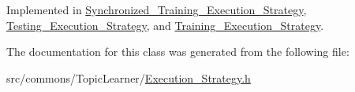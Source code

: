 Implemented in \hyperlink{class_synchronized___training___execution___strategy_a77e2fa3f19b544fa4392c9ed56c504e4}{Synchronized\_\-Training\_\-Execution\_\-Strategy}, \hyperlink{class_testing___execution___strategy_ab3d6335e164af39d38409a0bceee57c8}{Testing\_\-Execution\_\-Strategy}, and \hyperlink{class_training___execution___strategy_adc14f066d7a325e87035fb8224097c47}{Training\_\-Execution\_\-Strategy}.



The documentation for this class was generated from the following file:\begin{DoxyCompactItemize}
\item 
src/commons/TopicLearner/\hyperlink{_execution___strategy_8h}{Execution\_\-Strategy.h}\end{DoxyCompactItemize}
